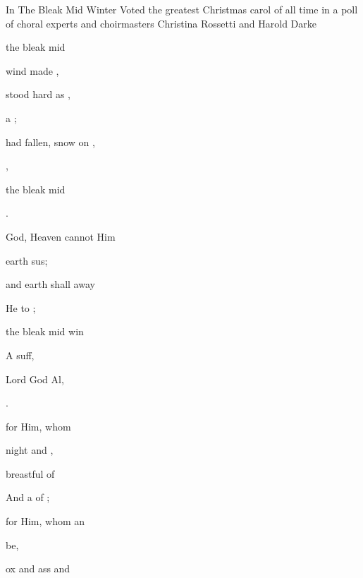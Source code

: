 \begin{SBSong}{In The Bleak Mid Winter}
    {Voted the greatest Christmas carol of all time in a poll of choral experts and choirmasters}
    {Christina Rossetti and Harold Darke}
  \begin{SBVerse}
     the bleak mid 
    
     wind made ,
    
     stood hard as , 
    
      a ;
    
     had fallen, snow on , 
    
      , 
    
     the bleak mid 

     .
  \end{SBVerse}
  \begin{SBVerse}
     God, Heaven cannot  Him 
    
     earth sus;
    
     and earth shall  away
    
     He  to ;
    
     the bleak mid win 
    
    A   suff, 
    
     Lord God Al, 
    
     .
  \end{SBVerse}
  \begin{SBVerse}
     for Him, whom  
    
     night and ,
    
     breastful of  
    
    And a   of ;
    
     for Him, whom an 
    
      be, 
    
     ox and ass and  
    

\end{SBVerse}
\end{SBSong}
